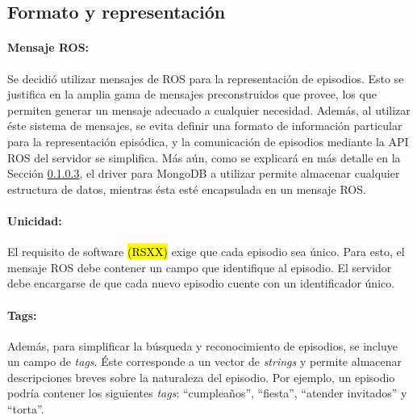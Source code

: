 
\subsection{Formato y representación}

\paragraph{Mensaje ROS:}
Se decidió utilizar mensajes de ROS para la representación de episodios. Esto se justifica en la amplia gama de mensajes preconstruidos que provee, los que permiten generar un mensaje adecuado a cualquier necesidad. Además, al utilizar éste sistema de mensajes, se evita definir una formato de información particular para la representación episódica, y la comunicación de episodios mediante la API ROS del servidor se simplifica. Más aún, como se explicará en más detalle en la Sección \ref{}, el driver para MongoDB a utilizar permite almacenar cualquier estructura de datos, mientras ésta esté encapsulada en un mensaje ROS.

\paragraph{Unicidad:}
El requisito de software \hl{(RSXX)} exige que cada episodio sea único. Para esto, el mensaje ROS debe contener un campo que identifique al episodio. El servidor debe encargarse de que cada nuevo episodio cuente con un identificador único.

\paragraph{Tags:}
Además, para simplificar la búsqueda y reconocimiento de episodios, se incluye un campo de \textit{tags}. Éste corresponde a un vector de \textit{strings} y permite almacenar descripciones breves sobre la naturaleza del episodio. Por ejemplo, un episodio podría contener los siguientes \textit{tags}: ``cumpleaños'', ``fiesta'', ``atender invitados'' y ``torta''.


